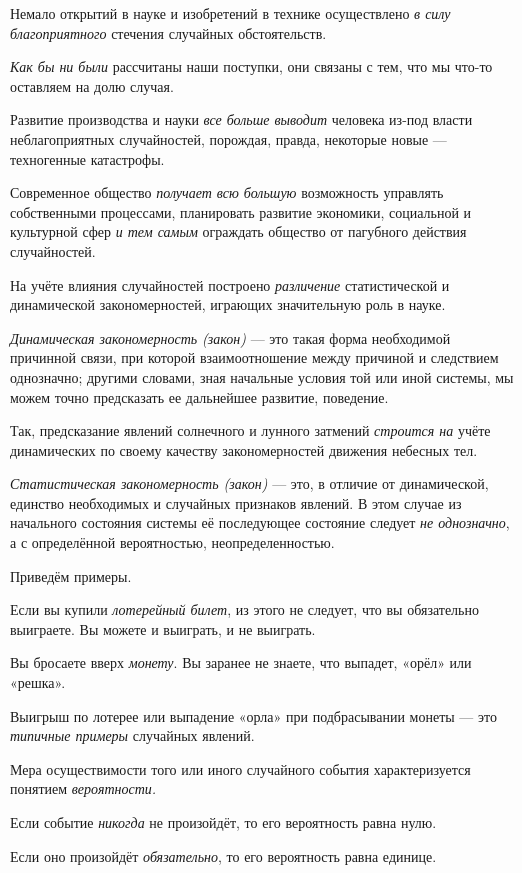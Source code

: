\documentclass[a4paper,14pt,russian]{extreport}
\begin{document}
Немало открытий в науке и изобретений в технике осуществлено \emph{в силу благоприятного} стечения случайных обстоятельств.

\emph{Как бы ни были} рассчитаны наши поступки, они связаны с тем, что мы что-то оставляем на долю случая.

Развитие производства и науки \emph{все больше выводит} человека из-под власти неблагоприятных случайностей, порождая, правда, некоторые новые --- техногенные катастрофы.

Современное общество \emph{получает всю большую} возможность управлять собственными процессами, планировать развитие экономики, социальной и культурной сфер \emph{и тем самым} ограждать общество от пагубного действия случайностей.

На учёте влияния случайностей построено \emph{различение} статистической и динамической закономерностей, играющих значительную роль в науке.

\emph{Динамическая закономерность (закон)} --- это такая форма необходимой причинной связи, при которой взаимоотношение между причиной и следствием однозначно; другими словами, зная начальные условия той или иной системы, мы можем точно предсказать ее дальнейшее развитие, поведение.

Так, предсказание явлений солнечного и лунного затмений \emph{строится на} учёте динамических по своему качеству закономерностей движения небесных тел.

\emph{Статистическая закономерность (закон)} --- это, в отличие от динамической, единство необходимых и случайных признаков явлений. В этом случае из начального состояния системы её последующее состояние следует \emph{не однозначно}, а с определённой вероятностью, неопределенностью.

Приведём примеры.

Если вы купили \emph{лотерейный билет}, из этого не следует, что вы обязательно выиграете. Вы можете и выиграть, и не выиграть.

Вы бросаете вверх \emph{монету}. Вы заранее не знаете, что выпадет, «орёл» или «решка».

Выигрыш по лотерее или выпадение «орла» при подбрасывании монеты --- это \emph{типичные примеры} случайных явлений.

Мера осуществимости того или иного случайного события характеризуется понятием \emph{вероятности.}

Если событие \emph{никогда} не произойдёт, то его вероятность равна нулю.

Если оно произойдёт \emph{обязательно}, то его вероятность равна единице.
\end{document}
